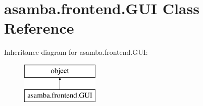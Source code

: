 \hypertarget{classasamba_1_1frontend_1_1_g_u_i}{}\section{asamba.\+frontend.\+G\+UI Class Reference}
\label{classasamba_1_1frontend_1_1_g_u_i}
Inheritance diagram for asamba.\+frontend.\+G\+UI\+:\begin{figure}[H]
\begin{center}
\leavevmode
\includegraphics[height=2.000000cm]{classasamba_1_1frontend_1_1_g_u_i}
\end{center}
\end{figure}
